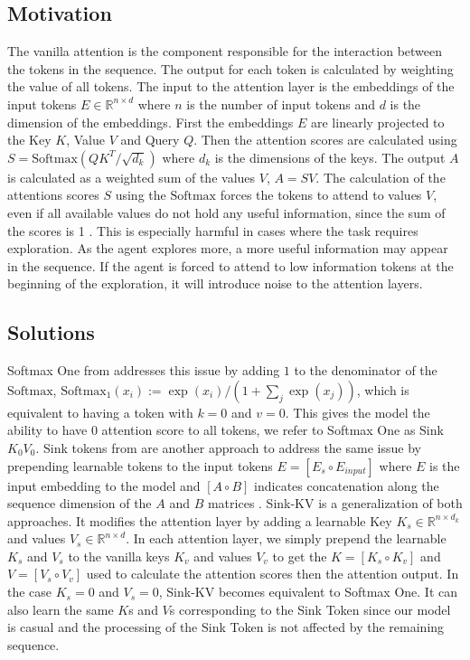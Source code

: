 \documentclass{article}
\newcommand{\sinkv}{Sink-KV\xspace}
\begin{document}
\subsection{Motivation}
The vanilla attention is the component responsible for the interaction between the tokens in the sequence. The output for each token is calculated by weighting the value of all tokens.
The input to the attention layer is the embeddings of the input tokens $E\in \mathbb{R}^{n\times d}$ where $n$ is the number of input tokens and $d$ is the dimension of the embeddings.
First the embeddings $E$ are linearly projected to the Key $K$, Value $V$ and Query $Q$. Then the attention scores are calculated using $S=\text{Softmax}(QK^T/\sqrt{d_k})$ where $d_k$ is the dimensions of the keys. The output $A$ is calculated as a weighted sum of the values $V$,  $A=SV$.
The calculation of the attentions scores $S$ using the $\text{Softmax}$ forces the tokens to attend to values $V$, even if all available values do not hold any useful information, since the sum of the scores is 1 \citep{off_by_one_softmax}. This is especially harmful in cases where the task requires exploration. As the agent explores more, a more useful information may appear in the sequence. If the agent is forced to attend to low information tokens at the beginning of the exploration, it will introduce noise to the attention layers.
\subsection{Solutions}
\label{sec:app-sinkkv-solutions}
Softmax One from \cite{off_by_one_softmax} addresses this issue by adding $1$ to the denominator of the $\text{Softmax}$, $\text{Softmax}_1(x_i) :=\exp(x_i)/(1+\sum_j{\exp(x_j)})$, which is equivalent to having a token with $k=0$ and $v=0$. This gives the model the ability to have 0 attention score to all tokens, we refer to Softmax One as Sink $K_0V_0$.
Sink tokens from \cite{xiao2023efficient} are another approach to address the same issue by prepending learnable tokens to the input tokens $E=[E_s \circ E_{input}]$ where $E$ is the input embedding to the model and $[A\circ B]$ indicates concatenation along the sequence dimension of the $A$ and $B$ matrices .
\sinkv is a generalization of both approaches. It modifies the attention layer by adding a learnable Key $K_s\in\mathbb{R}^{n\times d_k}$ and values $V_s\in\mathbb{R}^{n\times d}$. In each attention layer, we simply prepend the learnable $K_s$ and $V_s$ to the vanilla keys $K_v$ and values $V_v$ to get the $K=[K_s \circ K_v]$ and $V=[V_s \circ V_v]$ used to calculate the attention scores then the attention output.
In the case $K_s=0$ and $V_s=0$, \sinkv becomes equivalent to Softmax One. It can also learn the same $K$s and $V$s corresponding to the Sink Token since our model is casual and the processing of the Sink Token is not affected by the remaining sequence.
\end{document}
